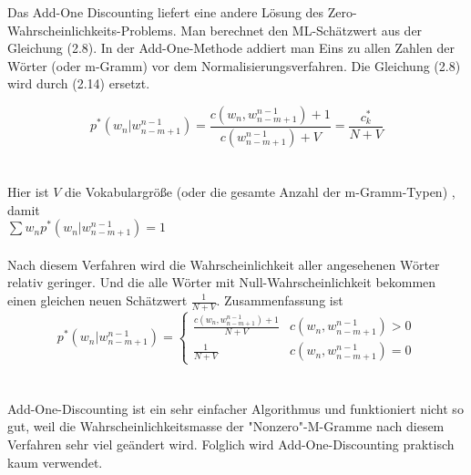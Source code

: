 Das Add-One Discounting liefert eine andere L\"osung des Zero-Wahrscheinlichkeits-Problems. Man berechnet den ML-Sch\"atzwert aus der Gleichung (2.8). In der Add-One-Methode addiert man Eins zu allen Zahlen der W\"orter (oder m-Gramm) vor dem Normalisierungsverfahren.  Die Gleichung (2.8) wird durch (2.14) ersetzt.

\begin{equation}
\label{equation:add_one_01}
p^{*}(w_{n}|w_{n-m+1}^{n-1})=\frac{c(w_{n},w_{n-m+1}^{n-1})+1}{c(w_{n-m+1}^{n-1})+V}=\frac{c_{k}^{*}}{N+V}
\end{equation}
\\
\\
Hier ist $V$ die Vokabulargr\"o\ss e (oder die gesamte Anzahl der m-Gramm-Typen) , damit \\ 
$\sum{w_{n}}p^{*}(w_{n}|w_{n-m+1}^{n-1})=1$
\\
\\
Nach diesem Verfahren wird die Wahrscheinlichkeit aller angesehenen W\"orter relativ geringer. Und die alle W\"orter mit Null-Wahrscheinlichkeit bekommen einen gleichen neuen Sch\"atzwert $\frac{1}{N+V}$. Zusammenfassung ist
\begin{equation}
p^{*}(w_{n}|w_{n-m+1}^{n-1})=\begin{cases}
\frac{c(w_{n},w_{n-m+1}^{n-1})+1}{N+V} & c(w_{n},w_{n-m+1}^{n-1})>0 \\
\frac{1}{N+V} & c(w_{n},w_{n-m+1}^{n-1})=0 
\end{cases}
\end{equation}
\\
\\
Add-One-Discounting ist ein sehr einfacher Algorithmus und funktioniert nicht so gut, weil die Wahrscheinlichkeitsmasse der "Nonzero"-M-Gramme nach diesem Verfahren sehr viel ge\"andert wird\cite{book_speech}. Folglich wird Add-One-Discounting  praktisch kaum verwendet.